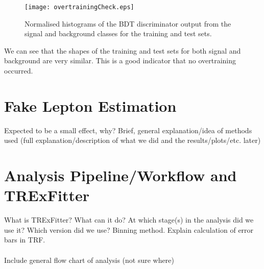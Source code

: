 \begin{figure}[h!]
	\texttt{[image: overtrainingCheck.eps]}
	\centering
	\caption{Normalised histograms of the BDT discriminator output from the signal and background classes for the training and test sets.}
	\label{fig:bdt-overtrain-check}
\end{figure}

We can see that the shapes of the training and test sets for both signal and background are very similar. This is a good indicator that no overtraining occurred.




\section{Fake Lepton Estimation} 
Expected to be a small effect, why? Brief, general explanation/idea of methods used (full explanation/description of what we did and the results/plots/etc. later) 
\section{Analysis Pipeline/Workflow and TRExFitter}
What is TRExFitter? What can it do? At which stage(s) in the analysis did we use it? Which version did we use? Binning method. Explain calculation of error bars in TRF. \\\\ 
Include general flow chart of analysis (not sure where)

